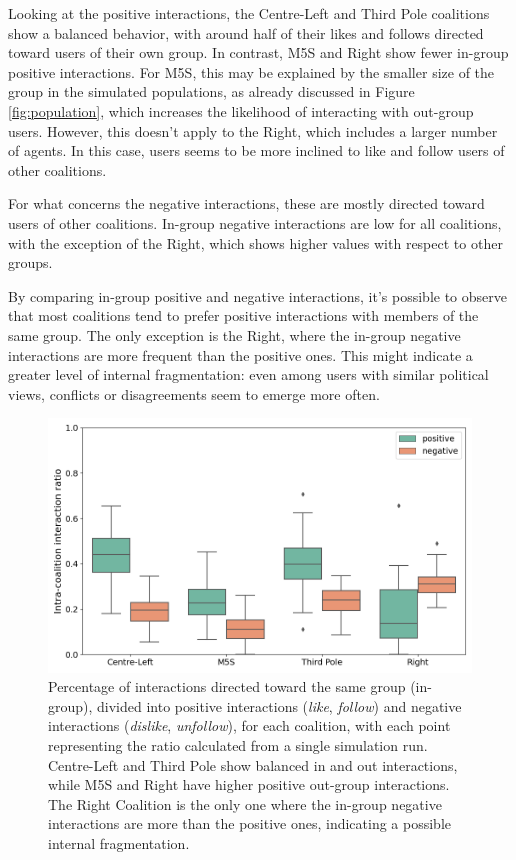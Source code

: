 Looking at the positive interactions, the Centre-Left and Third Pole coalitions show a balanced behavior, with around half of their likes and follows directed toward users of their own group.
In contrast, M5S and Right show fewer in-group positive interactions.
For M5S, this may be explained by the smaller size of the group in the simulated populations, as already discussed in Figure \ref{fig:population}, which increases the likelihood of interacting with out-group users.
However, this doesn't apply to the Right, which includes a larger number of agents. In this case, users seems to be more inclined to like and follow users of other coalitions.

For what concerns the negative interactions, these are mostly directed toward users of other coalitions.
In-group negative interactions are low for all coalitions, with the exception of the Right, which shows higher values with respect to other groups.

By comparing in-group positive and negative interactions, it's possible to observe that most coalitions tend to prefer positive interactions with members of the same group.
The only exception is the Right, where the in-group negative interactions are more frequent than the positive ones.
This might indicate a greater level of internal fragmentation: even among users with similar political views, conflicts or disagreements seem to emerge more often.


\begin{figure}[h]
    \centering
    \includegraphics[width=0.6\linewidth]{Images/Interactions/pos_neg_in_DefaultRecSys.png}
    \caption{Percentage of interactions directed toward the same group (in-group), divided into positive interactions (\textit{like}, \textit{follow}) and negative interactions (\textit{dislike}, \textit{unfollow}), for each coalition, with each point representing the ratio calculated from a single simulation run.
    Centre-Left and Third Pole show balanced in and out interactions, while M5S and Right have higher positive out-group interactions.
    The Right Coalition is the only one where the in-group negative interactions are more than the positive ones, indicating a possible internal fragmentation.}
    \label{fig:interactions_inout}
\end{figure}


